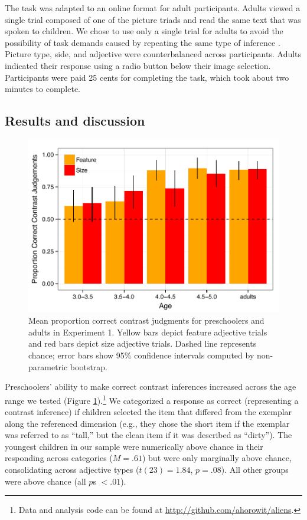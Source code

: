 \documentclass[man]{apa2}
\begin{document}
The task was adapted to an online format for adult participants.  Adults viewed a single trial composed of one of the picture triads and read the same text that was spoken to children. We chose to use only a single trial for adults to avoid the possibility of task demands caused by repeating the same type of inference \cite{frank2012}. Picture type, side, and adjective were counterbalanced across participants.  Adults indicated their response using a radio button below their image selection.  Participants were paid 25 cents for completing the task, which took about two minutes to complete. 

\subsection{Results and discussion}

\begin{figure}[t] 
  \begin{center} 
    \includegraphics[width=5in]{figures/expt1_mod.pdf} 
    \caption{\label{fig:expt1_kidsAdults} Mean proportion correct contrast judgments for preschoolers and adults in Experiment 1. Yellow bars depict feature adjective trials and red bars depict size adjective trials. Dashed line represents chance; error bars show 95\% confidence intervals computed by non-parametric bootstrap.}
  \end{center} 
\end{figure}	

Preschoolers' ability to make correct contrast inferences increased across the age range we tested (Figure \ref{fig:expt1_kidsAdults}).\footnote{Data and analysis code can be found at \url{http://github.com/ahorowit/aliens}.} We categorized a response as correct (representing a contrast inference) if children selected the item that differed from the exemplar along the referenced dimension (e.g., they chose the short item if the exemplar was referred to as ``tall,'' but the clean item if it was described as ``dirty''). The youngest children in our sample were numerically above chance in their responding across categories ($M=.61$) but were only marginally above chance, consolidating across adjective types ($t(23) = 1.84$, $p = .08$). All other groups were above chance (all $p$s $< .01$). 
\end{document}
